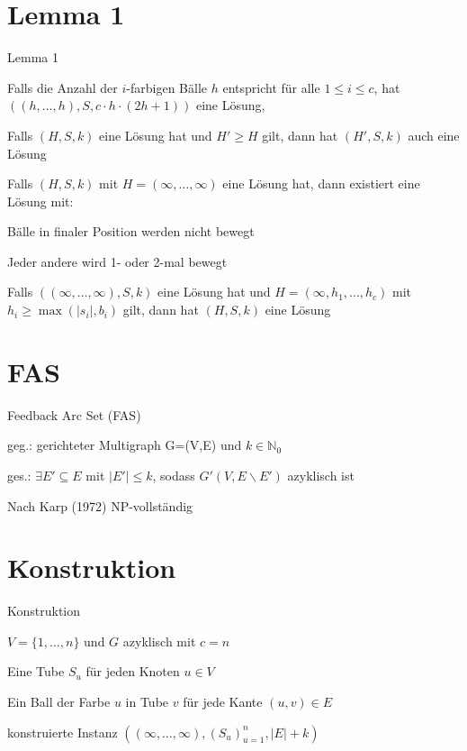 \documentclass{beamer}
\begin{document}
\section*{Lemma 1}
\begin{frame}{Lemma 1}
\begin{enumlist}
\item Falls die Anzahl der $i$-farbigen Bälle $h$ entspricht für alle $1 \leq i \leq c$, hat $((h,\dots,h),S,c\cdot h\cdot (2h+1))$ eine Lösung, 
\item Falls $(H,S,k)$ eine Lösung hat und $H' \geq H$ gilt, dann hat $(H',S,k)$ auch eine Lösung
\item Falls $(H,S,k)$ mit $H=(\infty,\dots, \infty)$ eine Lösung hat, dann existiert eine Lösung mit: \begin{pointlist}
\item Bälle in finaler Position werden nicht bewegt
\item Jeder andere wird 1- oder 2-mal bewegt
\end{pointlist}
\item Falls $((\infty, \dots,\infty),S,k)$ eine Lösung hat und $H=(\infty, h_1,\dots, h_c)$ mit $h_i \geq \max(|s_i|,b_i)$ gilt, dann hat $(H,S,k)$ eine Lösung
\end{enumlist}
\end{frame}

\section*{FAS}
\begin{frame}{Feedback Arc Set (FAS)}
\begin{pointlist}
\item geg.: gerichteter Multigraph G=(V,E) und $k\in\mathbb{N}_0$
\item ges.: $\exists E' \subseteq E$ mit $|E'|\leq k$, sodass $G'(V,E\backslash E')$ azyklisch ist
\begin{arrowlist}
\item Nach Karp (1972) NP-vollständig
\end{arrowlist}
\end{pointlist}
\end{frame}

\section*{Konstruktion}
\begin{frame}{Konstruktion}
\begin{pointlist}
\item $V=\{1,\dots,n\}$ und $G$ azyklisch mit $c=n$
\begin{arrowlist}
\item Eine Tube $S_u$ für jeden Knoten $u\in V$
\item Ein Ball der Farbe $u$ in Tube $v$ für jede Kante $(u,v)\in E$
\item konstruierte Instanz $((\infty, \dots, \infty), (S_u)_{u=1}^n, |E|+k)$
\end{arrowlist}
\end{pointlist}
\end{frame}
\end{document}
